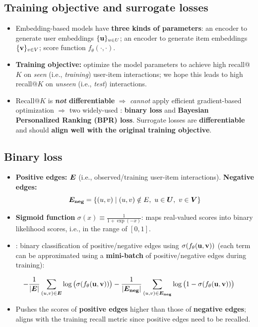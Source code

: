 \subsection{Training objective and surrogate losses}\label{sec:lec11-surrogate}

\begin{itemize}
  \item Embedding-based models have \textbf{three kinds of parameters}: an
    encoder to generate user embeddings $\{\mathbf{u}\}_{u\in U}$; an encoder to
    generate item embeddings $\{\mathbf{v}\}_{v\in V}$; score function
    $f_\theta(\cdot,\cdot)$.
  \item \textbf{Training objective:} optimize the model parameters to achieve
    high recall@$K$ on \emph{seen} (i.e., \emph{training}) user-item
    interactions; we hope this leads to high recall@$K$ on \emph{unseen}
    (i.e., \emph{test}) interactions.
  \item Recall@$K$ is \textbf{\emph{not} differentiable} $\Rightarrow$
    \emph{cannot} apply efficient gradient-based optimization $\Rightarrow$ two
    widely-used : \textbf{binary loss} and
    \textbf{Bayesian Personalized Ranking (BPR) loss}. Surrogate losses are
    \textbf{differentiable} and should \textbf{align well with the original
    training objective}.
\end{itemize}

\subsection{Binary loss}\label{sec:lec11-binary}

\begin{itemize}
  \item \textbf{Positive edges:} $\bm{E}$ (i.e., observed/training user-item
    interactions). \textbf{Negative edges:}
    \begin{equation}\label{eq:lec11-Eneg}
      \Eneg=\{(u,v)\mid(u,v)\notin E,\ u\in\Uset,\ v\in\Vset\}
    \end{equation}
  \item \textbf{Sigmoid function} $\sigma(x)\equiv\frac{1}{1+\exp(-x)}$: maps
    real-valued scores into binary likelihood scores, i.e., in the range of
    $[0,1]$.
  \item {}: binary classification of positive/negative edges
    using $\sigma(f_\theta(\mathbf{u},\mathbf{v}))$ (each term can be approximated using a
    \textbf{mini-batch} of positive/negative edges during training):
\end{itemize}
\begin{equation}\label{eq:lec11-binary}
  -\frac{1}{|\bm{E}|}\sum_{(u,v)\in\bm{E}}\log\big(\sigma(f_\theta(\mathbf{u},\mathbf{v}))\big)
  -\frac{1}{|\bm{E}_{\mathbf{neg}}|}\sum_{(u,v)\in\bm{E}_{\mathbf{neg}}}\log\big(1-\sigma(f_\theta(\mathbf{u},\mathbf{v}))\big)
\end{equation}
\begin{itemize}
  \item Pushes the scores of \textbf{positive edges} higher than those of
    \textbf{negative edges}; aligns with the training recall metric since
    positive edges need to be recalled.
\end{itemize}

